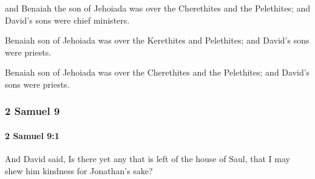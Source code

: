 			\begin{versebox}
					\item[BHS] 
					\item[ASV] and Benaiah the son of Jehoiada was over the Cherethites and the Pelethites; and David's sons were chief ministers.
					\item[NIV] Benaiah son of Jehoiada was over the Kerethites and Pelethites; and David’s sons were priests.
					\item[NRSV] Benaiah son of Jehoiada was over the Cherethites and the Pelethites; and David’s sons were priests.
			\end{versebox}
	\subsubsection{2 Samuel 9} %
		\label{2SAMUEL-9}

		\paragraph{2 Samuel 9:1} %
			\label{2SAMUEL-9-1}

			And David said, Is there yet any that is left of the house of Saul, that I may shew him kindness for Jonathan’s sake?

